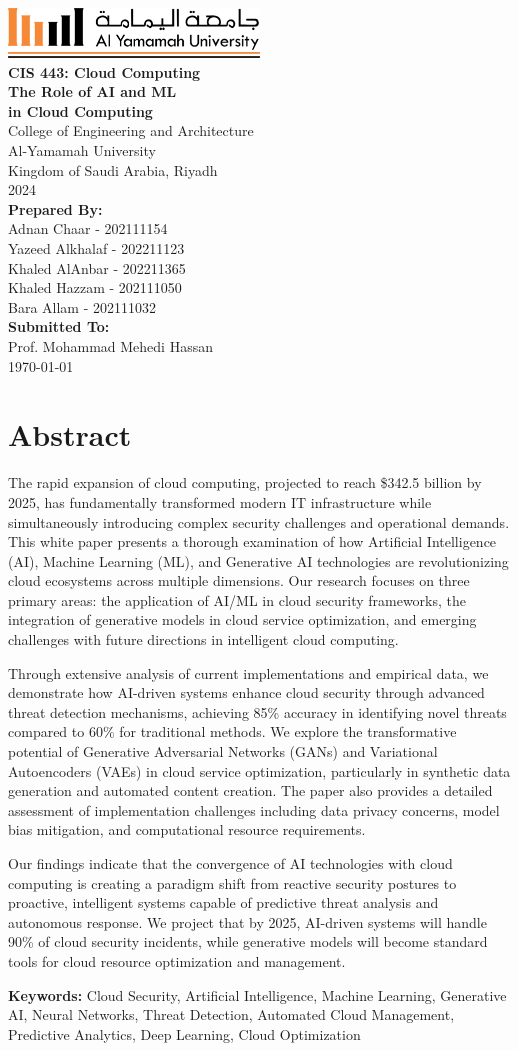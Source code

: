 \documentclass[a4paper,12pt]{article}
\def\maketitle{
  \begin{titlepage}
    \centering
    \vspace*{-1cm}
    \includegraphics[width=0.5\textwidth]{yu-logo.png}\\[2cm]
    {\huge\bfseries CIS 443: Cloud Computing \\[0.5cm] The Role of AI and ML\\[0.25cm]in Cloud Computing}\\[2cm]
    {\Large College of Engineering and Architecture}\\
    {Al-Yamamah University}\\
    {Kingdom of Saudi Arabia, Riyadh}\\[1cm]
    2024\\[2cm]
    {\large\bfseries Prepared By:}\\[0.3cm]
    Adnan Chaar - 202111154\\
    Yazeed Alkhalaf - 202211123\\
    Khaled AlAnbar - 202211365\\
    Khaled Hazzam - 202111050\\
    Bara Allam - 202111032\\
    [2cm]
    {\large\bfseries Submitted To:}\\[0.3cm]
    Prof. Mohammad Mehedi Hassan\\[2cm]
    {\large \today}
    \vfill
  \end{titlepage}
}
\begin{document}
\maketitle

\thispagestyle{fancy}
\tableofcontents
\newpage
\thispagestyle{fancy}
\listoffigures
\newpage

\setcounter{page}{1}

\section*{Abstract}
The rapid expansion of cloud computing, projected to reach \$342.5 billion by 2025, has fundamentally transformed modern IT infrastructure while simultaneously introducing complex security challenges and operational demands. This white paper presents a thorough examination of how Artificial Intelligence (AI), Machine Learning (ML), and Generative AI technologies are revolutionizing cloud ecosystems across multiple dimensions. Our research focuses on three primary areas: the application of AI/ML in cloud security frameworks, the integration of generative models in cloud service optimization, and emerging challenges with future directions in intelligent cloud computing.

Through extensive analysis of current implementations and empirical data, we demonstrate how AI-driven systems enhance cloud security through advanced threat detection mechanisms, achieving 85\% accuracy in identifying novel threats compared to 60\% for traditional methods. We explore the transformative potential of Generative Adversarial Networks (GANs) and Variational Autoencoders (VAEs) in cloud service optimization, particularly in synthetic data generation and automated content creation. The paper also provides a detailed assessment of implementation challenges including data privacy concerns, model bias mitigation, and computational resource requirements.

Our findings indicate that the convergence of AI technologies with cloud computing is creating a paradigm shift from reactive security postures to proactive, intelligent systems capable of predictive threat analysis and autonomous response. We project that by 2025, AI-driven systems will handle 90\% of cloud security incidents, while generative models will become standard tools for cloud resource optimization and management.

\textbf{Keywords:} Cloud Security, Artificial Intelligence, Machine Learning, Generative AI, Neural Networks, Threat Detection, Automated Cloud Management, Predictive Analytics, Deep Learning, Cloud Optimization
\end{document}
